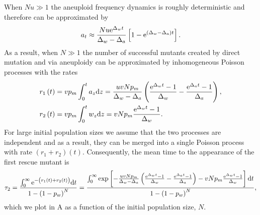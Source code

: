 \documentclass[12pt]{extarticle}
\renewcommand{\d}[1]{\ensuremath{\operatorname{d}\!{#1}}}
\renewcommand{\d}{{\rm d}}
\newcommand{\e}{{\rm e}}
\begin{document}
When $Nu\gg1$ the aneuploid frequency dynamics is roughly deterministic and therefore can be approximated by 
\begin{equation}
a_t \approx \frac{Nu\e^{\Delta_wt}}{\Delta_w-\Delta_a}\left[1-\e^{\left(\Delta_w-\Delta_a\right)t}\right].
\end{equation}
As a result, when $N\gg1$ %
the number of successful mutants created by direct mutation and via aneuploidy can be approximated by inhomogeneous Poisson processes with the rates
\begin{align}
r_1\left(t\right)&=vp_m\int_0^ta_{z} \d z = \frac{uvNp_m}{\Delta_w-\Delta_a}\left(\frac{\e^{\Delta_wt}-1}{\Delta_w}-\frac{\e^{\Delta_at}-1}{\Delta_a}\right),\\
r_2\left(t\right)&=vp_m\int_0^tw_{z} \d z = vNp_m\frac{\e^{\Delta_w t}-1}{\Delta_w}.
\end{align}
For large initial population sizes we assume that the two processes are independent and as a result, they can be merged into a single Poisson process with rate $\left(r_1+r_2\right)\left(t\right)$.
Consequently, the mean time to the appearance of the first rescue mutant is
\begin{align}\label{meantimet2}
\tau_2 = 
\frac{\int_0^\infty\e^{-\left(r_1(t)+r_2(t)\right)} \d t}{1-\left(1-p_w\right)^N} = 
\frac{\int_0^\infty\exp\left[-\frac{uvNp_m}{\Delta_w-\Delta_a}\left(\frac{\e^{\Delta_w t}-1}{\Delta_w}-\frac{\e^{\Delta_a t}-1}{\Delta_a}\right)-vNp_m\frac{\e^{\Delta_w t}-1}{\Delta_w}\right] \d t}{1-\left(1-p_w\right)^N},
\end{align}
which we plot in A as a function of the initial population size, $N$.
\end{document}

